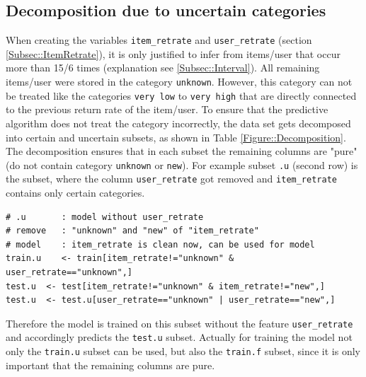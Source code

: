\documentclass[a4paper,12pt]{article}
\begin{document}
\subsection{Decomposition due to uncertain categories}\label{Subsec::4Split}
When creating the variables \texttt{item\_retrate} and \texttt{user\_retrate} (section \ref{Subsec::ItemRetrate}), it is only justified to infer from items/user that occur more than 15/6 times (explanation see \ref{Subsec::Interval}). All remaining items/user were stored in the category \texttt{unknown}. However, this category can not be treated like the categories \texttt{very low} to \texttt{very high} that are directly connected to the previous return rate of the item/user. To ensure that the predictive algorithm does not treat the category incorrectly, the data set gets decomposed into certain and uncertain subsets, as shown in Table \ref{Figure::Decomposition}. The decomposition ensures that in each subset the remaining columns are "pure" (do not contain category \texttt{unknown} or \texttt{new}). For example subset \texttt{.u} (second row) is the subset, where the column \texttt{user\_retrate} got removed and \texttt{item\_retrate} contains only certain categories. 
\begin{lstlisting}
# .u       : model without user_retrate
# remove   : "unknown" and "new" of "item_retrate"
# model    : item_retrate is clean now, can be used for model
train.u    <- train[item_retrate!="unknown" & user_retrate=="unknown",]
test.u  <- test[item_retrate!="unknown" & item_retrate!="new",]
test.u  <- test.u[user_retrate=="unknown" | user_retrate=="new",]
\end{lstlisting}
Therefore the model is trained on this subset without the feature \texttt{user\_retrate} and accordingly predicts the \texttt{test.u} subset. Actually for training the model not only the \texttt{train.u} subset can be used, but also the \texttt{train.f} subset, since it is only important that the remaining columns are pure.\\
\end{document}
